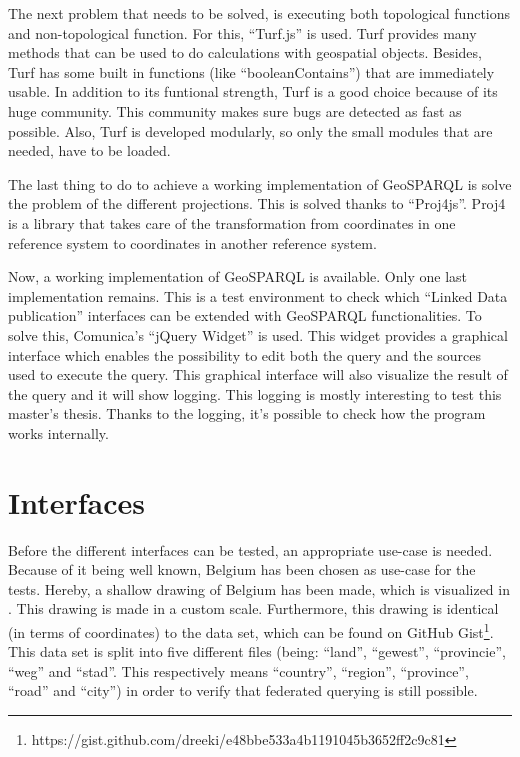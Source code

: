 \documentclass[twocolumn]{phdsymp} %
\begin{document}
The next problem that needs to be solved, is executing both topological functions and non-topological function. For this, ``Turf.js'' is used. Turf provides many methods that can be used to do calculations with geospatial objects. Besides, Turf has some built in functions (like ``booleanContains'') that are immediately usable. In addition to its funtional strength, Turf is a good choice because of its huge community. This community makes sure bugs are detected as fast as possible. Also, Turf is developed modularly, so only the small modules that are needed, have to be loaded.

The last thing to do to achieve a working implementation of GeoSPARQL is solve the problem of the different projections. This is solved thanks to ``Proj4js''. Proj4 is a library that takes care of the transformation from coordinates in one reference system to coordinates in another reference system.

Now, a working implementation of GeoSPARQL is available. Only one last implementation remains. This is a test environment to check which ``Linked Data publication'' interfaces can be extended with GeoSPARQL functionalities. To solve this, Comunica's ``jQuery Widget'' is used. This widget provides a graphical interface which enables the possibility to edit both the query and the sources used to execute the query. This graphical interface will also visualize the result of the query and it will show logging. This logging is mostly interesting to test this master's thesis. Thanks to the logging, it's possible to check how the program works internally. 
 
\section{Interfaces}
Before the different interfaces can be tested, an appropriate use-case is needed. Because of it being well known, Belgium has been chosen as use-case for the tests. Hereby, a shallow drawing of Belgium has been made, which is visualized in . This drawing is made in a custom scale. Furthermore, this drawing is identical (in terms of coordinates) to the data set, which can be found on GitHub Gist\footnote{https://gist.github.com/dreeki/e48bbe533a4b1191045b3652ff2c9c81}. This data set is split into five different files (being: ``land'', ``gewest'', ``provincie'', ``weg'' and ``stad''. This respectively means ``country'', ``region'', ``province'', ``road'' and ``city'') in order to verify that federated querying is still possible.
\end{document}
